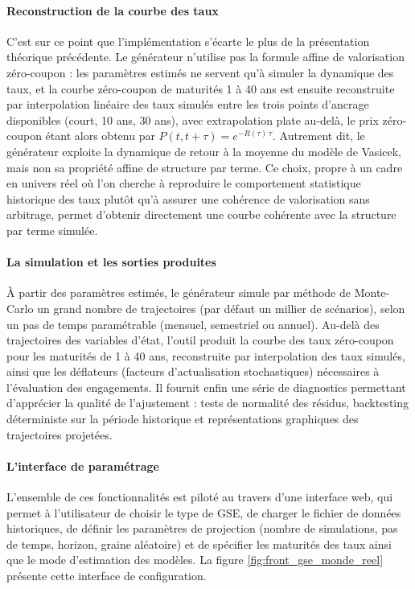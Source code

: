 \paragraph{Reconstruction de la courbe des taux}
C'est sur ce point que l'implémentation s'écarte le plus de la présentation théorique précédente. Le générateur n'utilise pas la formule affine de valorisation zéro-coupon : les paramètres estimés ne servent qu'à simuler la dynamique des taux, et la courbe zéro-coupon de maturités 1 à 40 ans est ensuite reconstruite par interpolation linéaire des taux simulés entre les trois points d'ancrage disponibles (court, 10 ans, 30 ans), avec extrapolation plate au-delà, le prix zéro-coupon étant alors obtenu par $P(t,t+\tau) = e^{-R(\tau)\,\tau}$. Autrement dit, le générateur exploite la dynamique de retour à la moyenne du modèle de Vasicek, mais non sa propriété affine de structure par terme. Ce choix, propre à un cadre en univers réel où l'on cherche à reproduire le comportement statistique historique des taux plutôt qu'à assurer une cohérence de valorisation sans arbitrage, permet d'obtenir directement une courbe cohérente avec la structure par terme simulée.

\paragraph{La simulation et les sorties produites}

À partir des paramètres estimés, le générateur simule par méthode de Monte-Carlo un grand nombre de trajectoires (par défaut un millier de scénarios), selon un pas de temps paramétrable (mensuel, semestriel ou annuel). Au-delà des trajectoires des variables d'état, l'outil produit la courbe des taux zéro-coupon pour les maturités de 1 à 40 ans, reconstruite par interpolation des taux simulés, ainsi que les déflateurs (facteurs d'actualisation stochastiques) nécessaires à l'évaluation des engagements. Il fournit enfin une série de diagnostics permettant d'apprécier la qualité de l'ajustement : tests de normalité des résidus, backtesting déterministe sur la période historique et représentations graphiques des trajectoires projetées.

\paragraph{L'interface de paramétrage}

L'ensemble de ces fonctionnalités est piloté au travers d'une interface web, qui permet à l'utilisateur de choisir le type de GSE, de charger le fichier de données historiques, de définir les paramètres de projection (nombre de simulations, pas de temps, horizon, graine aléatoire) et de spécifier les maturités des taux ainsi que le mode d'estimation des modèles. La figure \ref{fig:front_gse_monde_reel} présente cette interface de configuration.

